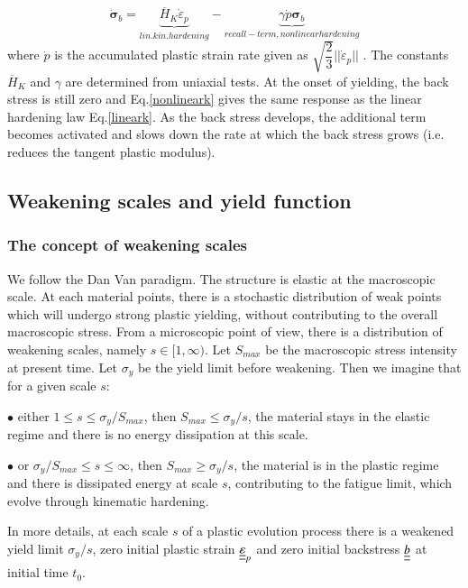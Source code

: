 \documentclass[3p,times,procedia,number]{elsarticle}
\begin{document}
\begin{equation}
\dot{\bm{\sigma}}_b=\underbrace{\overline{H}_K \dot{\varepsilon}_p}_{lin. kin. hardening} -\underbrace{\gamma\dot{p}\bm{\sigma}_b}_{recall - term, nonlinear hardening}
\label{nonlineark}
\end{equation}
where
$\dot{p}$ is the accumulated plastic strain rate given as $\sqrt{\dfrac{2}{3}}||\dot{\varepsilon}_p||$ . The constants
$\overline{H}_K$
and
$\gamma$
are determined from uniaxial tests.
At the onset of yielding, the
back stress is still zero and Eq.\eqref{nonlineark} gives the same response as the linear hardening
law Eq.\eqref{lineark}. As the back stress develops, the additional term becomes activated and
slows down the rate at which the back stress grows (i.e. reduces the tangent plastic
modulus).

\subsection{Weakening scales and yield function}
\subsubsection{The concept of weakening scales} 

We follow the Dan Van paradigm. The structure is elastic at the macroscopic scale. At each material points, there is a stochastic distribution of weak points which will undergo strong plastic yielding, without contributing to the overall macroscopic stress. From a microscopic point of view, there is a distribution of weakening scales, namely $s\in[1,\infty)$. Let $S_{max}$ be the macroscopic stress intensity at present time. Let $\sigma_y$ be the yield limit before weakening. Then we imagine that for a given scale $s$:

\vspace{6pt}
\noindent
$\bullet$ either $1\leqslant s\leqslant \sigma_y/S_{max}$, then $S_{max}\leqslant \sigma_y/s$, the material stays in the elastic regime and there is no energy dissipation at this scale.

\vspace{6pt}
\noindent
$\bullet$ or $\sigma_y/S_{max}\leqslant s\leqslant \infty$, then $S_{max}\geqslant \sigma_y/s$, the material is in the plastic regime and there is dissipated energy at scale $s$, contributing to the fatigue limit, which evolve through kinematic hardening.

In more details, at each scale $s$ of a plastic evolution process there is a weakened yield limit $\sigma_y/s$, zero initial plastic strain $\uline{\uline{\varepsilon}}_p$ and zero initial backstress $\uline{\uline{b}}$ at initial time $t_0$.
\end{document}

